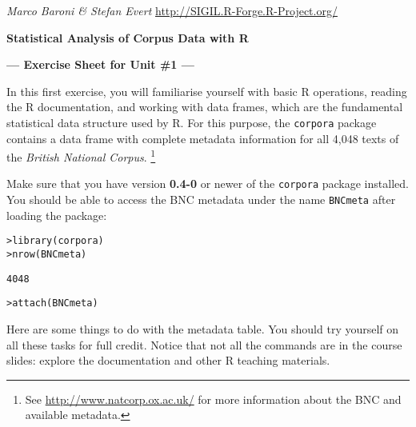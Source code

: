 \documentclass[a4paper,12pt]{article}
\begin{document}
\emph{Marco Baroni \& Stefan Evert} \hfill %
{\small \url{http://SIGIL.R-Forge.R-Project.org/}}

\begin{center}
  \textbf{\large Statistical Analysis of Corpus Data with R}

  \textbf{\large --- Exercise Sheet for Unit \#1 ---}
\end{center}

In this first exercise, you will familiarise yourself with basic R
operations, reading the R documentation, and working with data frames, which
are the fundamental statistical data structure used by R.  For this purpose,
the \texttt{corpora} package contains a data frame with complete metadata 
information for all 4,048 texts of the \emph{British National Corpus}.%
\footnote{See \url{http://www.natcorp.ox.ac.uk/} for more information about
  the BNC and available metadata.} %

Make sure that you have version \textbf{0.4-0} or newer of the
\texttt{corpora} package installed.  You should be able to access
the BNC metadata under the name \texttt{BNCmeta} after loading the
package:

\begin{alltt}
    > library(corpora)
    > nrow(BNCmeta)    \begin{Rout}
    [1] 4048 \end{Rout}
    > attach(BNCmeta)  
\end{alltt}

Here are some things to do with the metadata table.  You should try yourself
on all these tasks for full credit. Notice that not all the commands are in
the course slides: explore the documentation and other R teaching materials.
\end{document}
